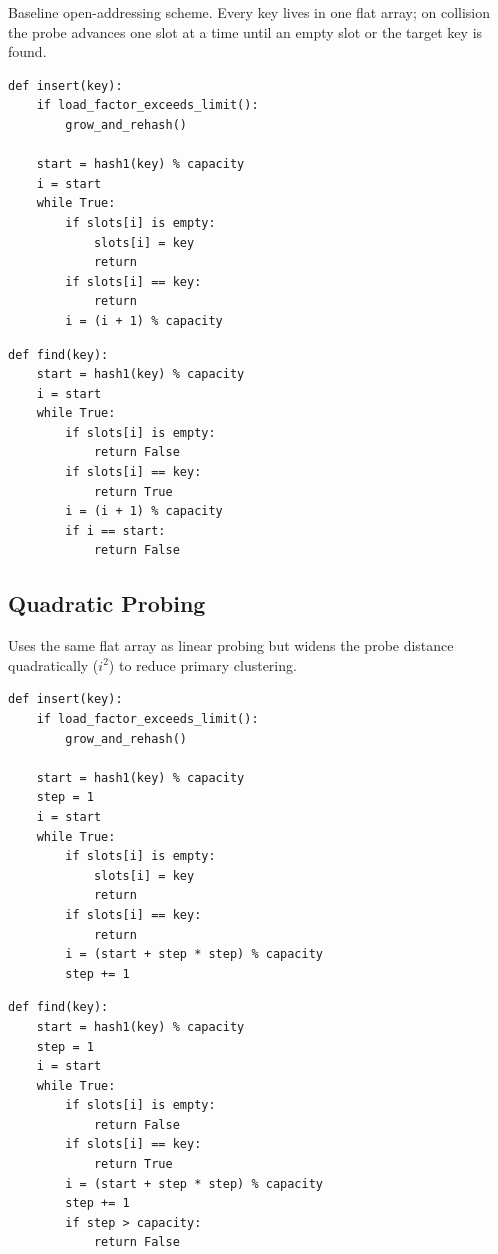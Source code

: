 \documentclass[11pt,a4paper]{article}
\begin{document}
Baseline open-addressing scheme. Every key lives in one flat array; on collision the probe advances one slot at a time until an empty slot or the target key is found.

\begin{lstlisting}[style=pseudocode, caption={Linear Probing -- insert}]
def insert(key):
    if load_factor_exceeds_limit():
        grow_and_rehash()

    start = hash1(key) % capacity
    i = start
    while True:
        if slots[i] is empty:
            slots[i] = key
            return
        if slots[i] == key:
            return
        i = (i + 1) % capacity
\end{lstlisting}

\begin{lstlisting}[style=pseudocode, caption={Linear Probing -- find}]
def find(key):
    start = hash1(key) % capacity
    i = start
    while True:
        if slots[i] is empty:
            return False
        if slots[i] == key:
            return True
        i = (i + 1) % capacity
        if i == start:
            return False
\end{lstlisting}

\subsection{Quadratic Probing}

Uses the same flat array as linear probing but widens the probe distance quadratically ($i^2$) to reduce primary clustering.

\begin{lstlisting}[style=pseudocode, caption={Quadratic Probing -- insert}]
def insert(key):
    if load_factor_exceeds_limit():
        grow_and_rehash()

    start = hash1(key) % capacity
    step = 1
    i = start
    while True:
        if slots[i] is empty:
            slots[i] = key
            return
        if slots[i] == key:
            return
        i = (start + step * step) % capacity
        step += 1
\end{lstlisting}

\begin{lstlisting}[style=pseudocode, caption={Quadratic Probing -- find}]
def find(key):
    start = hash1(key) % capacity
    step = 1
    i = start
    while True:
        if slots[i] is empty:
            return False
        if slots[i] == key:
            return True
        i = (start + step * step) % capacity
        step += 1
        if step > capacity:
            return False
\end{lstlisting}
\end{document}
